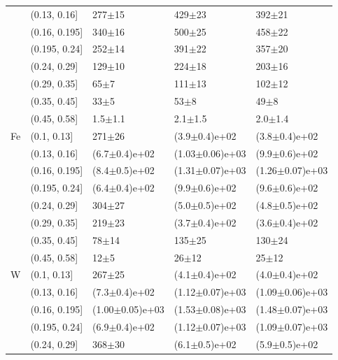\begin{table}
\begin{tabular}{lllll}
	& (0.13, 0.16] &           277$\pm$15 &           429$\pm$23 &           392$\pm$21 \\
	& (0.16, 0.195] &           340$\pm$16 &           500$\pm$25 &           458$\pm$22 \\
	& (0.195, 0.24] &           252$\pm$14 &           391$\pm$22 &           357$\pm$20 \\
	& (0.24, 0.29] &           129$\pm$10 &           224$\pm$18 &           203$\pm$16 \\
	& (0.29, 0.35] &             65$\pm$7 &           111$\pm$13 &           102$\pm$12 \\
	& (0.35, 0.45] &             33$\pm$5 &             53$\pm$8 &             49$\pm$8 \\
	& (0.45, 0.58] &          1.5$\pm$1.1 &          2.1$\pm$1.5 &          2.0$\pm$1.4 \\
\rowcol 	Fe & (0.1, 0.13] &           271$\pm$26 &    (3.9$\pm$0.4)e+02 &    (3.8$\pm$0.4)e+02 \\
\rowcol 	& (0.13, 0.16] &    (6.7$\pm$0.4)e+02 &  (1.03$\pm$0.06)e+03 &    (9.9$\pm$0.6)e+02 \\
\rowcol 	& (0.16, 0.195] &    (8.4$\pm$0.5)e+02 &  (1.31$\pm$0.07)e+03 &  (1.26$\pm$0.07)e+03 \\
\rowcol 	& (0.195, 0.24] &    (6.4$\pm$0.4)e+02 &    (9.9$\pm$0.6)e+02 &    (9.6$\pm$0.6)e+02 \\
\rowcol 	& (0.24, 0.29] &           304$\pm$27 &    (5.0$\pm$0.5)e+02 &    (4.8$\pm$0.5)e+02 \\
\rowcol 	& (0.29, 0.35] &           219$\pm$23 &    (3.7$\pm$0.4)e+02 &    (3.6$\pm$0.4)e+02 \\
\rowcol 	& (0.35, 0.45] &            78$\pm$14 &           135$\pm$25 &           130$\pm$24 \\
\rowcol 	& (0.45, 0.58] &             12$\pm$5 &            26$\pm$12 &            25$\pm$12 \\
	W & (0.1, 0.13] &           267$\pm$25 &    (4.1$\pm$0.4)e+02 &    (4.0$\pm$0.4)e+02 \\
	& (0.13, 0.16] &    (7.3$\pm$0.4)e+02 &  (1.12$\pm$0.07)e+03 &  (1.09$\pm$0.06)e+03 \\
	& (0.16, 0.195] &  (1.00$\pm$0.05)e+03 &  (1.53$\pm$0.08)e+03 &  (1.48$\pm$0.07)e+03 \\
	& (0.195, 0.24] &    (6.9$\pm$0.4)e+02 &  (1.12$\pm$0.07)e+03 &  (1.09$\pm$0.07)e+03 \\
	& (0.24, 0.29] &           368$\pm$30 &    (6.1$\pm$0.5)e+02 &    (5.9$\pm$0.5)e+02 \\

\end{tabular}
\end{table}
